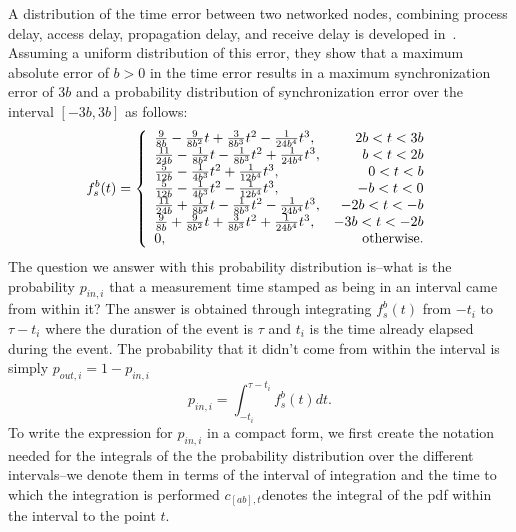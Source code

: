 A distribution of the time error between two networked nodes, combining process delay, access delay, propagation delay, and receive delay is developed in~\cite{timing-error}. Assuming a uniform distribution of this error, they show that a maximum absolute error of $b>0$ in the time error results in a maximum synchronization error of $3b$ and a probability distribution of synchronization error over the interval $[-3b, 3b]$ as follows:
\begin{equation}\label{eqn:syncerrordist}
    f_s^b(t)=\left\{\begin{array}{lr}
    {9 \over 8 b}-{9 \over 8 b^2}t+{3\over8 b^3}t^2-{1\over 24b^4}t^3, & 2b<t<3b\\
    {11\over 24b}-{1\over 8b^2}t-{1\over 8b^3}t^2+{1\over 24b^4}t^3, & b<t<2b\\
    {5\over 12b}-{1\over 4b^3}t^2+{1\over 12 b^4}t^3, & 0<t<b\\
    {5\over 12b}-{1\over 4b^3}t^2-{1\over 12 b^4}t^3, & -b<t<0\\
    {11\over 24b}+{1\over 8b^2}t-{1\over 8b^3}t^2-{1\over 24b^4}t^3, & -2b<t<-b\\
    {9 \over 8 b}+{9 \over 8 b^2}t+{3\over8 b^3}t^2+{1\over 24b^4}t^3, & -3b<t<-2b\\
    0, &\mathrm{otherwise.}
    \end{array} \right.
\end{equation}
The question we answer with this probability distribution is--what is the probability $p_{in,i}$ that a measurement time stamped as being in an interval came from within it? The answer is obtained through integrating $f_s^b(t)$ from $-t_i$ to $\tau-t_i$ where the duration of the event is $\tau$ and $t_i$ is the time already elapsed during the event. The probability that it didn't come from within the interval is simply $p_{out,i}=1-p_{in,i}$
\begin{equation}
p_{in,i}=\int_{-t_i}^{\tau-t_i}f_s^b(t)dt\label{eqn:pin} .
\end{equation}
To write the expression for $p_{in,i}$ in a compact form, we first create the notation needed for the integrals of the the probability distribution over the different intervals--we denote them in terms of the interval of integration and the time to which the integration is performed $c_{[a b],t}$denotes the integral of the pdf within the interval to the point $t$.
